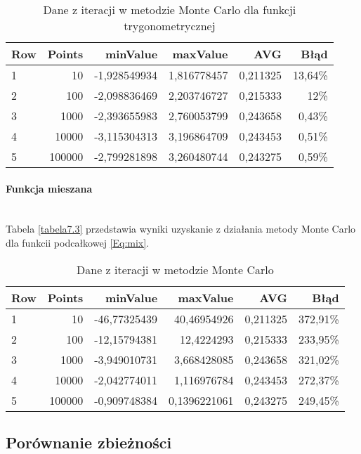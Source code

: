 \documentclass[12pt,twoside]{article}
\begin{document}
\begin{table}[H]
\centering 
\caption{Dane z iteracji w metodzie Monte Carlo dla funkcji trygonometrycznej}
\label{tabela7.2}
\begin{tabular}{lrrrrr}
\toprule
{Row} &  Points &  minValue &  maxValue &       AVG &      Błąd \\
\midrule
1  &     10 & -1,928549934 &   1,816778457 & 0,211325 & 13,64\% \\
2  &     100 & -2,098836469 &  2,203746727 & 0,215333 & 12\% \\
3  &     1000 & -2,393655983 &   2,760053799 & 0,243658 & 0,43\% \\
4  &     10000 & -3,115304313 &  3,196864709 & 0,243453 & 0,51\% \\
5  &     100000 & -2,799281898 &  3,260480744 & 0,243275 & 0,59\% \\
\bottomrule
\end{tabular}
\end{table}

\paragraph{Funkcja mieszana}\mbox{} \\

Tabela \eqref{tabela7.3} przedstawia wyniki uzyskanie z działania metody Monte Carlo dla funkcii podcałkowej \eqref{Eq:mix}.

\begin{table}[H]
\centering 
\caption{Dane z iteracji w metodzie Monte Carlo}
\label{tabela7.3}
\begin{tabular}{lrrrrr}
\toprule
{Row} &  Points &  minValue &  maxValue &       AVG &      Błąd \\
\midrule
1  &     10 & -46,77325439 &   40,46954926 & 0,211325 & 372,91\% \\
2  &     100 & -12,15794381 &  12,4224293 & 0,215333 & 233,95\% \\
3  &     1000 & -3,949010731 &   3,668428085 & 0,243658 & 321,02\% \\
4  &     10000 & -2,042774011 &  1,116976784 & 0,243453 & 272,37\% \\
5  &     100000 & -0,909748384 &  0,1396221061 & 0,243275 & 249,45\% \\
\bottomrule
\end{tabular}
\end{table}

\subsection{Porównanie zbieżności}
\end{document}
